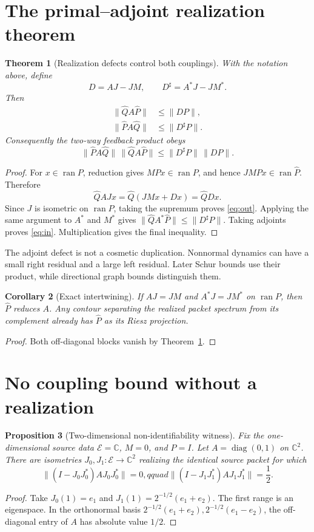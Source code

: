 \documentclass[12pt]{article}
\newtheorem{theorem}{Theorem}
\newtheorem{proposition}[theorem]{Proposition}
\newtheorem{corollary}[theorem]{Corollary}
\newcommand{\cE}{\mathcal E}
\newcommand{\norm}[1]{\lVert#1\rVert}
\begin{document}
\section{The primal--adjoint realization theorem}
\begin{theorem}[Realization defects control both couplings]
\label{thm:realization}
With the notation above, define
\[
 D=AJ-JM,\qquad D^\sharp=A^*J-JM^*.
\]
Then
\begin{align}
 \norm{\widehat QA\widehat P}&\leq\norm{DP},\label{eq:out}\\
 \norm{\widehat PA\widehat Q}&\leq\norm{D^\sharp P}.\label{eq:in}
\end{align}
Consequently the two-way feedback product obeys
\[
 \norm{\widehat PA\widehat Q}\,
 \norm{\widehat QA\widehat P}
 \leq \norm{D^\sharp P}\,\norm{DP}.
\]
\end{theorem}
\begin{proof}
For $x\in\operatorname{ran}P$, reduction gives $MPx\in\operatorname{ran}P$,
and hence $JMPx\in\operatorname{ran}\widehat P$.  Therefore
\[
 \widehat QAJx=\widehat Q(JMx+Dx)=\widehat QDx.
\]
Since $J$ is isometric on $\operatorname{ran}P$, taking the supremum proves
\eqref{eq:out}.  Applying the same argument to $A^*$ and $M^*$ gives
$\norm{\widehat QA^*\widehat P}\leq\norm{D^\sharp P}$.  Taking adjoints
proves \eqref{eq:in}.  Multiplication gives the final inequality.
\end{proof}

The adjoint defect is not a cosmetic duplication.  Nonnormal dynamics can
have a small right residual and a large left residual.  Later Schur bounds
use their product, while directional graph bounds distinguish them.

\begin{corollary}[Exact intertwining]
If $AJ=JM$ and $A^*J=JM^*$ on $\operatorname{ran}P$, then $\widehat P$
reduces $A$.  Any contour separating the realized packet spectrum from its
complement already has $\widehat P$ as its Riesz projection.
\end{corollary}
\begin{proof}
Both off-diagonal blocks vanish by Theorem~\ref{thm:realization}.
\end{proof}

\section{No coupling bound without a realization}
\begin{proposition}[Two-dimensional non-identifiability witness]
Fix the one-dimensional source data $\cE=\mathbb C$, $M=0$, and $P=I$.
Let $A=\operatorname{diag}(0,1)$ on $\mathbb C^2$.  There are isometries
$J_0,J_1:\cE\to\mathbb C^2$ realizing the identical source packet for which
\[
 \norm{(I-J_0J_0^*)AJ_0J_0^*}=0,qquad
 \norm{(I-J_1J_1^*)AJ_1J_1^*}=\frac12.
\]
\end{proposition}
\begin{proof}
Take $J_0(1)=e_1$ and $J_1(1)=2^{-1/2}(e_1+e_2)$.  The first range is an
eigenspace.  In the orthonormal basis
$2^{-1/2}(e_1+e_2),2^{-1/2}(e_1-e_2)$, the off-diagonal entry of $A$ has
absolute value $1/2$.
\end{proof}
\end{document}
